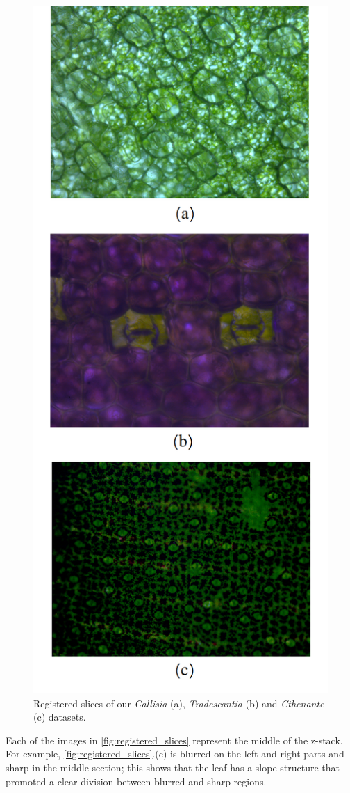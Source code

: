 \begin{figure}[htb]
    \centering
    \caption{Registered slices of our \textit{Callisia} (a), \textit{Tradescantia} (b) and \textit{Cthenante} (c) datasets.}
    \label{fig:registered_slices}
    \includegraphics[scale=.32]{images/middle_images.png} \centering
    \fautor
\end{figure}

Each of the images in \autoref{fig:registered_slices} represent the middle of the z-stack. For example, \autoref{fig:registered_slices}.(c) is blurred on the left and right parts and sharp in the middle section; this shows that the leaf has a slope structure that promoted a clear division between blurred and sharp regions. 